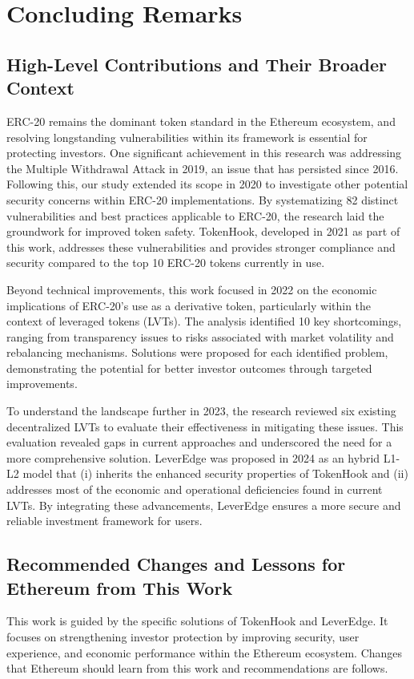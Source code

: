 
\chapter{Concluding Remarks}\label{ch:remarks}
\section{High-Level Contributions and Their Broader Context}
ERC-20 remains the dominant token standard in the Ethereum ecosystem, and resolving longstanding vulnerabilities within its framework is essential for protecting investors. One significant achievement in this research was addressing the Multiple Withdrawal Attack in 2019, an issue that has persisted since 2016. Following this, our study extended its scope in 2020 to investigate other potential security concerns within ERC-20 implementations. By systematizing 82 distinct vulnerabilities and best practices applicable to ERC-20, the research laid the groundwork for improved token safety. TokenHook, developed in 2021 as part of this work, addresses these vulnerabilities and provides stronger compliance and security compared to the top 10 ERC-20 tokens currently in use.

Beyond technical improvements, this work focused in 2022 on the economic implications of ERC-20's use as a derivative token, particularly within the context of leveraged tokens (LVTs). The analysis identified 10 key shortcomings, ranging from transparency issues to risks associated with market volatility and rebalancing mechanisms. Solutions were proposed for each identified problem, demonstrating the potential for better investor outcomes through targeted improvements.

To understand the landscape further in 2023, the research reviewed six existing decentralized LVTs to evaluate their effectiveness in mitigating these issues. This evaluation revealed gaps in current approaches and underscored the need for a more comprehensive solution. LeverEdge was proposed in 2024 as an hybrid L1-L2 model that (i) inherits the enhanced security properties of TokenHook and (ii) addresses most of the economic and operational deficiencies found in current LVTs. By integrating these advancements, LeverEdge ensures a more secure and reliable investment framework for users.

\section{Recommended Changes and Lessons for Ethereum from This Work}
This work is guided by the specific solutions of TokenHook and LeverEdge. It focuses on strengthening investor protection by improving security, user experience, and economic performance within the Ethereum ecosystem. Changes that Ethereum should learn from this work and recommendations are follows.

